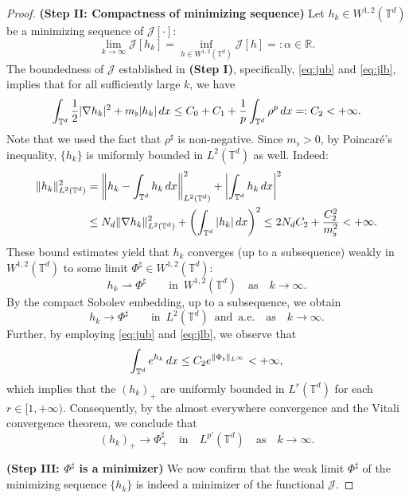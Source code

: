 \documentclass[11pt,reqno,a4paper]{amsart}
\newcommand{\R}{\mathbb{R}}
\newcommand{\intt}{\int_{\T^d}}
\theoremstyle{definition}
\theoremstyle{remark}
\numberwithin{equation}{section}
\newcommand{\T} {\mathbb T}
\newcommand{\lt}{\left}
\newcommand{\rt}{\right}
\newcommand{\bq}{\begin{equation}}
\newcommand{\eq}{\end{equation}}
\newcommand{\calJ}{\mathcal J}
\newcommand{\weakto}{\rightharpoonup}
\newcommand{\dx}{\textnormal{d}x}
\begin{document}
\begin{proof}
\noindent \textbf{(Step II: Compactness of minimizing sequence)} Let $h_k \in W^{1,2}(\T^d)$ be a minimizing sequence of $\calJ[\cdot]$:
\[
\lim_{k\to\infty} \calJ[h_k]=\inf_{h \in W^{1,2}(\T^d)} \calJ[h]=:\alpha \in \R.
\]
The boundedness of $\calJ$ established in {\bf (Step I)}, specifically, \eqref{eq:jub} and \eqref{eq:jlb}, implies that for all sufficiently large $k$, we have
\bq\label{eq:c2}
\intt \frac{1}{2}|\nabla h_k|^2 + m_\flat |h_k| \,\dx \le C_0+C_1 + \frac{1}{p}\intt \rho^p \,\dx  =:C_2< +\infty.
\eq
Note that we used the fact that $\rho^\sharp$ is non-negative. Since $m_\flat>0$, by Poincar\'e's inequality, $\{h_k\}$ is uniformly bounded in $L^2(\T^d)$ as well. Indeed:
\bq\label{eq:l2b}
\begin{split}
\|h_k\|_{L^2(\T^d)}^2 &= \lt\| h_k - \intt h_k \, \dx\rt\|_{L^2(\T^d)}^2 + \lt|\intt h_k \,\dx\rt|^2 \\
&\le N_d\|\nabla h_k\|_{L^2(\T^d)}^2 + \lt(\intt |h_k|\,\dx\rt)^2 \le 2N_dC_2 + \frac{C_2^2}{m_\flat^2}<+\infty.
\end{split}
\eq
These bound estimates yield that $h_k$ converges (up to a subsequence) weakly in $W^{1,2}(\T^d)$ to some limit $\Phi^\sharp \in W^{1,2}(\T^d)$:
\[
h_k \weakto \Phi^\sharp \qquad \text{in}\,\,\, W^{1,2}(\T^d) \quad \mbox{as} \quad k \to \infty.
\]
By the compact Sobolev embedding, up to a subsequence, we obtain
\[
h_k \to \Phi^\sharp \qquad \text{in}\,\,\, L^{2}(\T^d) \,\,\,\text{and}\,\,\,\text{a.e.} \quad \mbox{as} \quad k \to \infty.
\]
Further, by employing \eqref{eq:jub} and \eqref{eq:jlb}, we observe that
\[
\intt e^{h_k} \,\dx \le C_2 e^{\|\Phi_\flat\|_{L^\infty}}<+\infty,
\]
which implies that the $(h_k)_+$ are uniformly bounded in $L^r(\T^d)$ for each $r\in[1,+\infty)$. Consequently, by the almost everywhere convergence and the Vitali convergence theorem, we conclude that 
\begin{equation}
\label{eq: h_k+ conv}
(h_k)_+ \to \Phi^\sharp_+ \quad \text{in}\quad L^{p'}(\T^d) \quad \mbox{as} \quad k \to \infty.
\end{equation}


\medskip

\noindent \textbf{(Step III: $\Phi^\sharp$ is a minimizer)} We now confirm that the weak limit $\Phi^\sharp$ of the minimizing sequence $\{h_k\}$ is indeed a minimizer of the functional $\calJ$. 


\end{proof}
\end{document}

